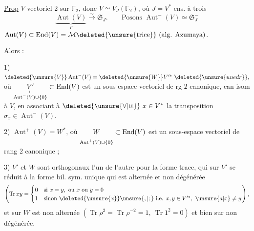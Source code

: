 \uline{Prop} \(V\) vectoriel   \(2\) sur \(\mathbb F_2\), donc \(V\simeq V_J(\mathbb F_2)\), où \(J=V^*\) ens. à trois 
\[
\underbrace{\operatorname{Aut}(V)}_{\Gamma}\xrightarrow{\sim}\mathfrak S_J.
\qquad\text{Posons }\operatorname{Aut}^{-}(V)\simeq\mathfrak S_J^{-}
\]
 \(\operatorname{Aut}(V)\subset\operatorname{End}(V)=\mathcal M\deleted{\unsure{\mathrm{trice}}}\ \text{(alg. Azumaya})\).

Alors :

1) \(\deleted{\unsure{V}}\operatorname{Aut}^{-}(V)=\deleted{\unsure{W}}V'^{*}\ \deleted{\unsure{une dr}},\) où
\(\underset{\substack{\shortparallel\\\operatorname{Aut}^{-}(V)\cup\{0\}}}{V'}\subset\operatorname{End}(V)\)
est un sous-espace vectoriel de rg \(2\) canonique, can isom à \(V\), en associant à \(\deleted{\unsure{\forall|\mathrm{tt}}}\ x\in V^*\) la transposition \(\sigma_x\in\operatorname{Aut}^{-}(V)\).

2) \(\operatorname{Aut}^{+}(V)=W^{*}\), où
\(\underset{\substack{\shortparallel\\\operatorname{Aut}^{+}(V)\cup\{0\}}}{W}\subset\operatorname{End}(V)\)
est un sous-espace vectoriel de rang \(2\) canonique ;

3) \(V'\) et \(W\) sont orthogonaux l'un de l'autre pour la forme trace, qui sur \(V'\) se réduit à la forme bil. sym. unique qui est alternée et non dégénérée
\[
\left(\operatorname{Tr}xy=
\begin{cases}
0 & \text{si }x=y,\ \text{ou }x\ \text{ou }y=0\\
1 & \text{sinon}\ \deleted{\unsure{x}}\unsure{,|;}\ \text{i.e. }x,y\in V'^{*},\ \unsure{a|x}\ne y
\end{cases}\right),
\]
et sur \(W\) est non alternée \((\operatorname{Tr}\rho^2=\operatorname{Tr}\rho^{-2}=1,\ \operatorname{Tr}1^2=0)\)
et bien sur non dégénérée.


